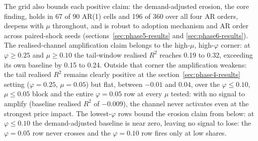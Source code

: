 \documentclass[12pt]{article}
\begin{document}
The grid also bounds each positive claim: the demand-adjusted erosion, the core finding, holds in 67 of 90 AR(1) cells and 196 of 360 over all four AR orders, deepens with $\mu$ throughout, and is robust to adoption mechanism and AR order across paired-shock seeds (sections~\ref{sec:phase5-results} and \ref{sec:phase6-results}). %
The realised-channel amplification claim belongs to the high-$\mu$, high-$\varphi$ corner: at $\varphi\geq0.25$ and $\mu\geq0.10$ the tail-window realised $R^{2}$ reaches 0.19 to 0.32, exceeding its own baseline by 0.15 to 0.24. %
Outside that corner the amplification weakens: the tail realised $R^{2}$ remains clearly positive at the section~\ref{sec:phase4-results} setting ($\varphi=0.25$, $\mu=0.05$) but flat, between $-0.01$ and $0.04$, over the $\varphi\leq0.10$, $\mu\leq0.05$ block and the entire $\varphi=0.05$ row at every $\mu$ tested: with no signal to amplify (baseline realised $R^{2}$ of $-0.009$), the channel never activates even at the strongest price impact. %
The lowest-$\varphi$ rows bound the erosion claim from below: at $\varphi\leq0.10$ the demand-adjusted baseline is near zero, leaving no signal to lose: the $\varphi=0.05$ row never crosses and the $\varphi=0.10$ row fires only at low shares. %
\end{document}
